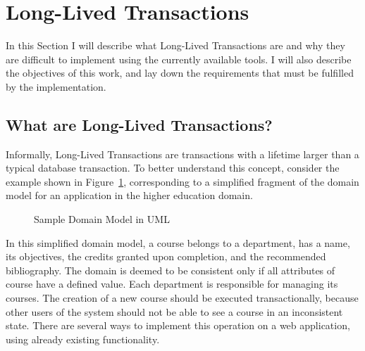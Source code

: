 \documentclass{llncs}
\begin{document}

\section{Long-Lived Transactions}

In this Section I will describe what Long-Lived Transactions are and
why they are difficult to implement using the currently available
tools. I will also describe the objectives of this work, and lay down
the requirements that must be fulfilled by the implementation.

\subsection{What are Long-Lived Transactions?}
\label{sec:what}

Informally, Long-Lived Transactions are transactions with a lifetime
larger than a typical database transaction. To better understand this
concept, consider the example shown in Figure~\ref{fig:courseDomain},
corresponding to a simplified fragment of the domain model for an
application in the higher education domain.

\begin{figure}
  \centering

\caption{Sample Domain Model in UML}
\label{fig:courseDomain}

\end{figure}

In this simplified domain model, a course belongs to a department, has
a name, its objectives, the credits granted upon completion, and the
recommended bibliography. The domain is deemed to be consistent only
if all attributes of course have a defined value. Each department is
responsible for managing its courses. The creation of a new course
should be executed transactionally, because other users of the system
should not be able to see a course in an inconsistent state. There are
several ways to implement this operation on a web application, using already existing
functionality.
\end{document}
